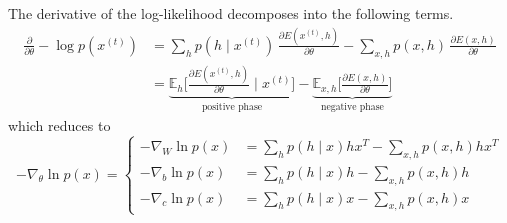 \documentclass{article}
\begin{document}
    \begin{theorem}
      \label{thm:decomposition-of-derivative}
      The derivative of the log-likelihood decomposes into the following terms. 
      \begin{align} 
        \frac{\partial}{\partial \theta} - \log p(x^{(t)}) & = \sum_{h}  p(h \mid x^{(t)}) \, \frac{ \partial E(x^{(t)}, h)}{\partial \theta} - \sum_{x, h} p(x, h) \, \frac{\partial E(x, h)}{\partial \theta} \\
                                                           & = \underbrace{\mathbb{E}_{h} \bigg[ \frac{\partial E( x^{(t)}, h)}{\partial \theta} \; \bigg| \; x^{(t)} \bigg]}_{\text{positive phase}} - \underbrace{\mathbb{E}_{x, h} \bigg[ \frac{\partial E(x, h)}{\partial \theta} \bigg]}_{\text{negative phase}}
      \end{align}
      which reduces to 
      \begin{equation}
        -\nabla_\theta \ln{p(x)} = \begin{cases}
          - \nabla_W \ln{p(x)} & = \sum_h p(h \mid x) h x^T - \sum_{x, h} p(x, h) h x^T \\
          - \nabla_b \ln{p(x)} & =  \sum_h p(h \mid x) h - \sum_{x, h} p(x, h) h \\
          - \nabla_c \ln{p(x)} & =  \sum_h p(h \mid x) x - \sum_{x, h} p(x, h) x
        \end{cases}
      \end{equation}
    \end{theorem}
\end{document}
